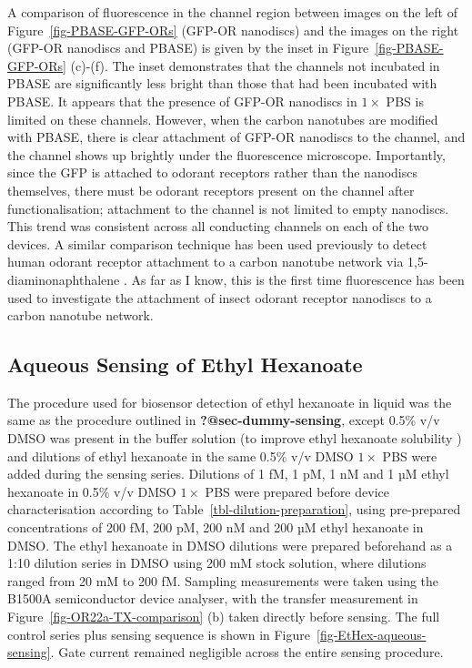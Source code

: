 \documentclass[
  a4paper,
]{scrbook}
\begin{document}
A comparison of fluorescence in the channel region between images on the
left of Figure~\ref{fig-PBASE-GFP-ORs} (GFP-OR nanodiscs) and the images
on the right (GFP-OR nanodiscs and PBASE) is given by the inset in
Figure~\ref{fig-PBASE-GFP-ORs} (c)-(f). The inset demonstrates that the
channels not incubated in PBASE are significantly less bright than those
that had been incubated with PBASE. It appears that the presence of
GFP-OR nanodiscs in \(1 \times\) PBS is limited on these channels.
However, when the carbon nanotubes are modified with PBASE, there is
clear attachment of GFP-OR nanodiscs to the channel, and the channel
shows up brightly under the fluorescence microscope. Importantly, since
the GFP is attached to odorant receptors rather than the nanodiscs
themselves, there must be odorant receptors present on the channel after
functionalisation; attachment to the channel is not limited to empty
nanodiscs. This trend was consistent across all conducting channels on
each of the two devices. A similar comparison technique has been used
previously to detect human odorant receptor attachment to a carbon
nanotube network via 1,5-diaminonaphthalene \autocite{Lee2012b}. As far
as I know, this is the first time fluorescence has been used to
investigate the attachment of insect odorant receptor nanodiscs to a
carbon nanotube network.

\hypertarget{sec-EtHex-aqueous-sensing}{%
\subsection{Aqueous Sensing of Ethyl
Hexanoate}\label{sec-EtHex-aqueous-sensing}}

The procedure used for biosensor detection of ethyl hexanoate in liquid
was the same as the procedure outlined in \textbf{?@sec-dummy-sensing},
except 0.5\% v/v DMSO was present in the buffer solution (to improve
ethyl hexanoate solubility \autocite{Galvao2014}) and dilutions of ethyl
hexanoate in the same 0.5\% v/v DMSO \(1 \times\) PBS were added during
the sensing series. Dilutions of 1 fM, 1 pM, 1 nM and 1 µM ethyl
hexanoate in 0.5\% v/v DMSO \(1 \times\) PBS were prepared before device
characterisation according to Table~\ref{tbl-dilution-preparation},
using pre-prepared concentrations of 200 fM, 200 pM, 200 nM and 200 µM
ethyl hexanoate in DMSO. The ethyl hexanoate in DMSO dilutions were
prepared beforehand as a 1:10 dilution series in DMSO using 200 mM stock
solution, where dilutions ranged from 20 mM to 200 fM. Sampling
measurements were taken using the B1500A semiconductor device analyser,
with the transfer measurement in Figure~\ref{fig-OR22a-TX-comparison}
(b) taken directly before sensing. The full control series plus sensing
sequence is shown in Figure~\ref{fig-EtHex-aqueous-sensing}. Gate
current remained negligible across the entire sensing procedure.
\end{document}
